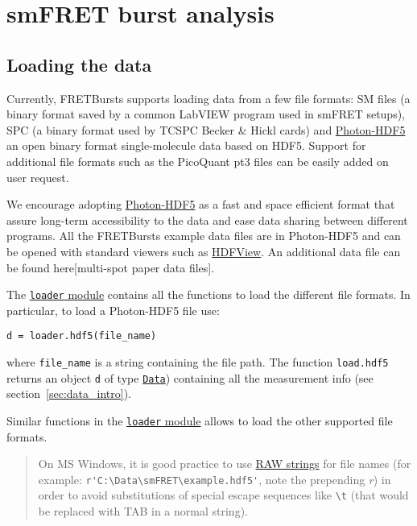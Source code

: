 \section{smFRET burst analysis}

\subsection{Loading the data}
Currently, FRETBursts supports loading data from a few file formats: SM files
(a binary format saved by a common LabVIEW program used in smFRET setups), 
SPC (a binary format used by TCSPC Becker \& Hickl cards) and 
\href{http://photon-hdf5.readthedocs.org/}{Photon-HDF5}  an open binary 
format single-molecule data based on HDF5. Support for additional file formats
such as the PicoQuant pt3 files can be easily added on user request.

We encourage adopting \href{http://photon-hdf5.readthedocs.org/}{Photon-HDF5}
as a fast and space efficient format that assure long-term accessibility 
to the data and ease data sharing between different programs. All the 
FRETBursts example data files are in Photon-HDF5 and can be opened with 
standard viewers such as 
\href{http://www.hdfgroup.org/products/java/hdfview/}{HDFView}. An additional data file 
can be found here[multi-spot paper data files].

The \href{http://fretbursts.readthedocs.org/en/latest/loader.html}{\texttt{loader} module}
contains all the functions to load the different file formats. 
In particular, to load a Photon-HDF5 file use:

\begin{verbatim}
d = loader.hdf5(file_name)
\end{verbatim}

where \verb|file_name| is a string containing the file path. The function
\verb|load.hdf5| returns an object \verb|d| of type 
\href{http://fretbursts.readthedocs.org/en/latest/data_class.html}{\texttt{Data}}) 
containing all the measurement info (see section~\ref{sec:data_intro}).

Similar functions in the 
\href{http://fretbursts.readthedocs.org/en/latest/loader.html}{\texttt{loader} module} 
allows to load the other supported file formats.

\begin{quote}
On MS Windows, it is good practice to use 
\href{https://docs.python.org/2/tutorial/introduction.html#strings}{RAW strings} 
for file names (for example: \verb|r'C:\Data\smFRET\example.hdf5'|, note the 
prepending \textit{r}) in order to avoid substitutions of special escape 
sequences like \verb|\t| (that would be replaced with TAB in a normal string).
\end{quote}

